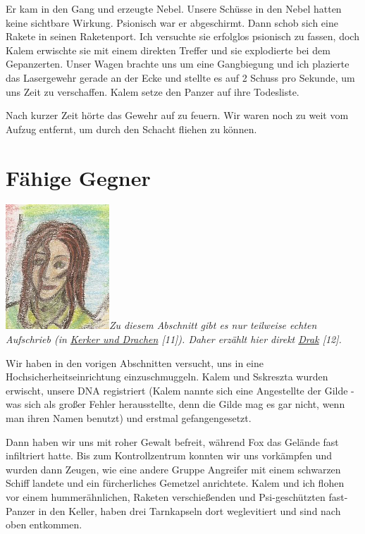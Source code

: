 \documentclass[11pt]{scrartcl}
\begin{document}
Er kam in den Gang und erzeugte Nebel. Unsere Schüsse in den Nebel
hatten keine sichtbare Wirkung. Psionisch war er abgeschirmt. Dann schob
sich eine Rakete in seinen Raketenport. Ich versuchte sie erfolglos
psionisch zu fassen, doch Kalem erwischte sie mit einem direkten Treffer
und sie explodierte bei dem Gepanzerten. Unser Wagen brachte uns um eine
Gangbiegung und ich plazierte das Lasergewehr gerade an der Ecke und
stellte es auf 2 Schuss pro Sekunde, um uns Zeit zu verschaffen. Kalem
setze den Panzer auf ihre Todesliste.

Nach kurzer Zeit hörte das Gewehr auf zu feuern. Wir waren noch zu weit
vom Aufzug entfernt, um durch den Schacht fliehen zu können.

\section{Fähige Gegner}

\includegraphics{sskreszta-portrait-alt-klein.png}\emph{Zu diesem
Abschnitt gibt es nur teilweise echten Aufschrieb (in
\href{http://1w6.org/deutsch/kampagnen/waechter-der-zeit/gedaechtniskristall/kerker-und-drachen}{Kerker
und Drachen} {[}11{]}). Daher erzählt hier direkt
\href{http://1w6.org/uzanto/drak}{Drak} {[}12{]}.}

Wir haben in den vorigen Abschnitten versucht, uns in eine
Hochsicherheitseinrichtung einzuschmuggeln. Kalem und Sskreszta wurden
erwischt, unsere DNA registriert (Kalem nannte sich eine Angestellte der
Gilde - was sich als großer Fehler herausstellte, denn die Gilde mag es
gar nicht, wenn man ihren Namen benutzt) und erstmal gefangengesetzt.

Dann haben wir uns mit roher Gewalt befreit, während Fox das Gelände
fast infiltriert hatte. Bis zum Kontrollzentrum konnten wir uns
vorkämpfen und wurden dann Zeugen, wie eine andere Gruppe Angreifer mit
einem schwarzen Schiff landete und ein fürcherliches Gemetzel
anrichtete. Kalem und ich flohen vor einem hummerähnlichen, Raketen
verschießenden und Psi-geschützten fast-Panzer in den Keller, haben drei
Tarnkapseln dort weglevitiert und sind nach oben entkommen.
\end{document}
